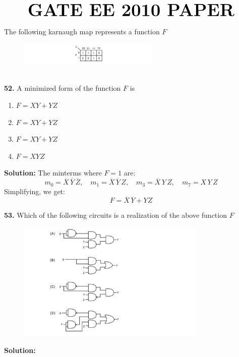 \documentclass{article}
\date{\today}
\begin{document}
\thispagestyle{fancy}
\fancyhf{}
\renewcommand{\headrulewidth}{0.4pt}
\fancyfoot[c]{\thepage}
\vspace{1cm}
\begin{center}
$$\textbf{\Huge GATE EE 2010 PAPER}$$
\end{center}
The following karnaugh map represents a function \(F\)\\
\begin{figure}[h!]
    \centering
    \includegraphics[width=0.6\textwidth]{Kmap.jpg}
\end{figure}\\
\textbf{52.} A minimized form of the function \( F \) is
\begin{enumerate}[label=(\Alph*)]
    \item \( F = XY + YZ \)
    \item \( F = X Y + Y Z \)
    \item \( F = X Y + Y Z \)
    \item \( F = X Y Z \)
\end{enumerate}
\textbf{Solution:}
The minterms where $F=1$ are:
$$
m_0 = \overline{X} \, \overline{Y} \, \overline{Z}, \quad
m_1 = \overline{X} \, \overline{Y} \, Z, \quad
m_3 = \overline{X} \, Y \, Z, \quad
m_7 = X \, Y \, Z
$$
Simplifying, we get:
$$
F = \overline{X} \, \overline{Y} + YZ
$$

\textbf{53.} Which of the following circuits is a realization of the above function \(F\)

\begin{figure}[h!]
    \centering
    \includegraphics[width=0.8\textwidth]{DigitalCircuits.jpg}
\end{figure}
\newpage
\textbf{Solution:}
\end{document}
